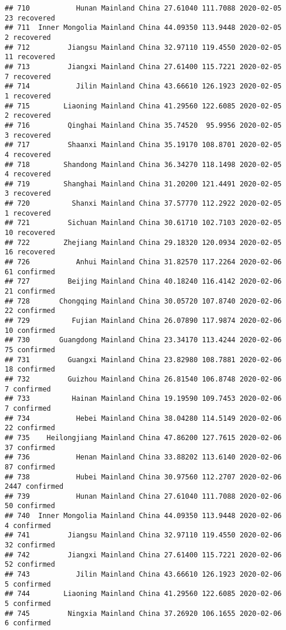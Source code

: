 \documentclass[
]{article}
\begin{document}
\begin{verbatim}
## 710           Hunan Mainland China 27.61040 111.7088 2020-02-05    23 recovered
## 711  Inner Mongolia Mainland China 44.09350 113.9448 2020-02-05     2 recovered
## 712         Jiangsu Mainland China 32.97110 119.4550 2020-02-05    11 recovered
## 713         Jiangxi Mainland China 27.61400 115.7221 2020-02-05     7 recovered
## 714           Jilin Mainland China 43.66610 126.1923 2020-02-05     1 recovered
## 715        Liaoning Mainland China 41.29560 122.6085 2020-02-05     2 recovered
## 716         Qinghai Mainland China 35.74520  95.9956 2020-02-05     3 recovered
## 717         Shaanxi Mainland China 35.19170 108.8701 2020-02-05     4 recovered
## 718        Shandong Mainland China 36.34270 118.1498 2020-02-05     4 recovered
## 719        Shanghai Mainland China 31.20200 121.4491 2020-02-05     3 recovered
## 720          Shanxi Mainland China 37.57770 112.2922 2020-02-05     1 recovered
## 721         Sichuan Mainland China 30.61710 102.7103 2020-02-05    10 recovered
## 722        Zhejiang Mainland China 29.18320 120.0934 2020-02-05    16 recovered
## 726           Anhui Mainland China 31.82570 117.2264 2020-02-06    61 confirmed
## 727         Beijing Mainland China 40.18240 116.4142 2020-02-06    21 confirmed
## 728       Chongqing Mainland China 30.05720 107.8740 2020-02-06    22 confirmed
## 729          Fujian Mainland China 26.07890 117.9874 2020-02-06    10 confirmed
## 730       Guangdong Mainland China 23.34170 113.4244 2020-02-06    75 confirmed
## 731         Guangxi Mainland China 23.82980 108.7881 2020-02-06    18 confirmed
## 732         Guizhou Mainland China 26.81540 106.8748 2020-02-06     7 confirmed
## 733          Hainan Mainland China 19.19590 109.7453 2020-02-06     7 confirmed
## 734           Hebei Mainland China 38.04280 114.5149 2020-02-06    22 confirmed
## 735    Heilongjiang Mainland China 47.86200 127.7615 2020-02-06    37 confirmed
## 736           Henan Mainland China 33.88202 113.6140 2020-02-06    87 confirmed
## 738           Hubei Mainland China 30.97560 112.2707 2020-02-06  2447 confirmed
## 739           Hunan Mainland China 27.61040 111.7088 2020-02-06    50 confirmed
## 740  Inner Mongolia Mainland China 44.09350 113.9448 2020-02-06     4 confirmed
## 741         Jiangsu Mainland China 32.97110 119.4550 2020-02-06    32 confirmed
## 742         Jiangxi Mainland China 27.61400 115.7221 2020-02-06    52 confirmed
## 743           Jilin Mainland China 43.66610 126.1923 2020-02-06     5 confirmed
## 744        Liaoning Mainland China 41.29560 122.6085 2020-02-06     5 confirmed
## 745         Ningxia Mainland China 37.26920 106.1655 2020-02-06     6 confirmed

\end{verbatim}
\end{document}
